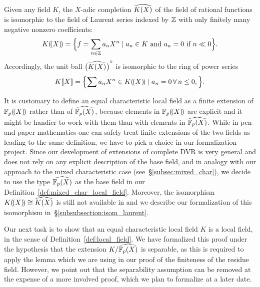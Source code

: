 \documentclass[sigplan,screen]{acmart}
\begin{document}
\begin{remark}\label{rmk:laurent_vs_adic}
Given any field $K$, the $X$-adic completion $\FpXCompl[K]$ of the field of rational functions is isomorphic to the field of Laurent series indexed by $\ZZ$ with only finitely many negative nonzero coefficients:
\[
\laurentseries[K]=\Bigl\{f=\sum_{n \in\ZZ}a_nX^n \mid a_n \in K\text{ and }a_n = 0 \text{ if }n\ll 0\Bigr\}.
\]
Accordingly, the unit ball $\FpXComplInt[K]$ is isomorphic to the ring of power series
\[
\powerseries[K]=\Bigl\{\sum a_nX^n \in \laurentseries[K]\mid a_n=0 \,\forall\,n\le 0, \Bigr\}.
\]

It is customary to define an equal characteristic local field as a finite extension of $\laurentseries$ rather than of $\FpXCompl$, because elements in $\laurentseries$ are explicit and it might be handier to work with them than with elements in $\FpXCompl$. While in pen-and-paper mathematics one can safely treat finite extensions of the two fields as leading to the same definition, we have to pick a choice in our formalization project. Since our development of extensions of complete DVR is very general and does not rely on any explicit description of the base field, and in analogy with our approach to the mixed characteristic case (see~\S\ref{subsec:mixed_char}), we decide to use the type $\FpXCompl$ as the base field in our Definition~\ref{def:mixed_char_local_field}. Moreover, the isomorphism $\laurentseries[K]\cong \FpXCompl[K]$ is still not available in \mathlib and we describe our formalization of this isomorphism in~\S\ref{subsubsection:isom_laurent}.
\end{remark}

Our next task is to show that an equal characteristic local field $K$ is a local field, in the sense of Definition~\ref{def:local_field}. We have formalized this proof under the hypothesis that the extension $K/\FpXCompl$ is separable, as this is required to apply the \mathlib lemma \href{https://leanprover-community.github.io/mathlib_docs/ring_theory/dedekind_domain/integral_closure.html#is_integral_closure.is_noetherian}{\extlink} which we are using in our proof of the finiteness of the residue field. However, we point out that the separability assumption can be removed at the expense of a more involved proof, which we plan to formalize at a later date.
\end{document}

